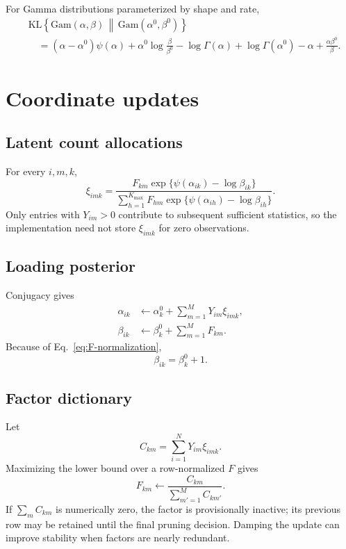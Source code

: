 \documentclass[11pt]{article}
\newcommand{\Gam}{\mathrm{Gam}}
\newcommand{\KL}{\mathrm{KL}}
\begin{document}
For Gamma distributions parameterized by shape and rate,
\begin{align}
  &\KL\!\left\{
    \Gam(\alpha,\beta)
    \,\middle\|\,
    \Gam(\alpha^0,\beta^0)
  \right\}
  \nonumber\\
  &\quad=
  (\alpha-\alpha^0)\psi(\alpha)
  +\alpha^0\log\frac{\beta}{\beta^0}
  -\log\Gamma(\alpha)+\log\Gamma(\alpha^0)
  -\alpha+\frac{\alpha\beta^0}{\beta}.
  \label{eq:gamma-kl}
\end{align}


\section{Coordinate updates}

\subsection{Latent count allocations}

For every $i,m,k$,
\begin{equation}
  \xi_{imk}
  =
  \frac{
    F_{km}\exp\{\psi(\alpha_{ik})-\log\beta_{ik}\}
  }{
    \sum_{h=1}^{K_{\max}}
    F_{hm}\exp\{\psi(\alpha_{ih})-\log\beta_{ih}\}
  }.
  \label{eq:xi-update}
\end{equation}
Only entries with $Y_{im}>0$ contribute to subsequent sufficient statistics,
so the implementation need not store $\xi_{imk}$ for zero observations.

\subsection{Loading posterior}

Conjugacy gives
\begin{align}
  \alpha_{ik}
  &\leftarrow
  \alpha_k^0+
  \sum_{m=1}^M Y_{im}\xi_{imk},
  \label{eq:alpha-update}\\
  \beta_{ik}
  &\leftarrow
  \beta_k^0+
  \sum_{m=1}^M F_{km}.
  \label{eq:beta-update}
\end{align}
Because of Eq.~\eqref{eq:F-normalization},
\begin{equation}
  \beta_{ik}=\beta_k^0+1.
  \label{eq:beta-normalized}
\end{equation}

\subsection{Factor dictionary}

Let
\begin{equation}
  C_{km}
  =
  \sum_{i=1}^N Y_{im}\xi_{imk}.
  \label{eq:factor-count}
\end{equation}
Maximizing the lower bound over a row-normalized $F$ gives
\begin{equation}
  F_{km}
  \leftarrow
  \frac{C_{km}}{\sum_{m'=1}^M C_{km'}}.
  \label{eq:F-update}
\end{equation}
If $\sum_m C_{km}$ is numerically zero, the factor is provisionally inactive;
its previous row may be retained until the final pruning decision.  Damping
the update can improve stability when factors are nearly redundant.
\end{document}
